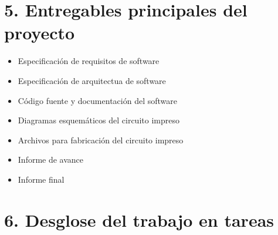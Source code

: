 \documentclass[11pt]{charter}
\begin{document}
\section{5. Entregables principales del proyecto}
\label{sec:entregables}

\begin{itemize}
\item Especificación de requisitos de software
\item Especificación de arquitectua de software
\item Código fuente y documentación del software
\item Diagramas esquemáticos del circuito impreso
\item Archivos para fabricación del circuito impreso
\item Informe de avance
\item Informe final
\end{itemize}

\newpage

\section{6. Desglose del trabajo en tareas}
\label{sec:wbs}
\end{document}
